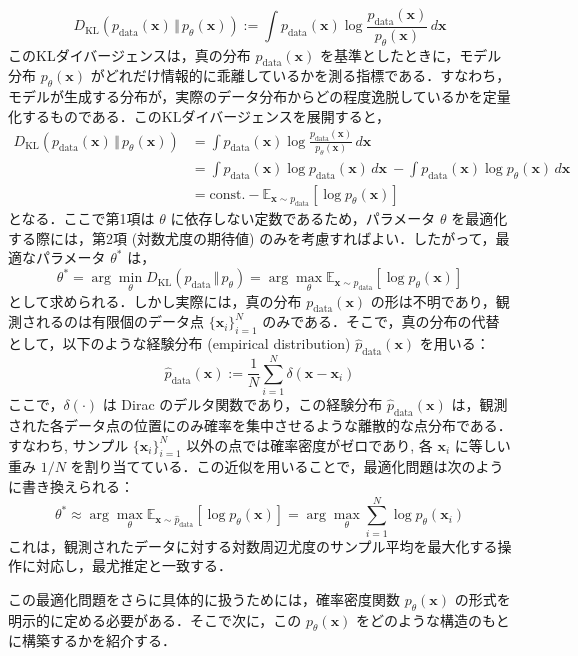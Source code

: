\documentclass[titlepage]{ltjsbook}
\begin{document}
\begin{equation}
D_{\mathrm{KL}}\left(p_{\mathrm{data}}(\mathbf{x}) \,\Vert\, p_\theta(\mathbf{x})\right)
:= \int p_{\mathrm{data}}(\mathbf{x}) \log \frac{p_{\mathrm{data}}(\mathbf{x})}{p_\theta(\mathbf{x})} \, d\mathbf{x}
\end{equation}
このKLダイバージェンスは，真の分布 $p_{\mathrm{data}}(\mathbf{x})$ を基準としたときに，モデル分布 $p_\theta(\mathbf{x})$ がどれだけ情報的に乖離しているかを測る指標である．すなわち，モデルが生成する分布が，実際のデータ分布からどの程度逸脱しているかを定量化するものである．このKLダイバージェンスを展開すると，
\begin{align}
D_{\mathrm{KL}}\left(p_{\mathrm{data}}(\mathbf{x}) \,\Vert\, p_\theta(\mathbf{x})\right)
&= \int p_{\mathrm{data}}(\mathbf{x}) \log \frac{p_{\mathrm{data}}(\mathbf{x})}{p_\theta(\mathbf{x})} \, d\mathbf{x} \\
&= \int p_{\mathrm{data}}(\mathbf{x}) \log p_{\mathrm{data}}(\mathbf{x}) \, d\mathbf{x} 
\ - \int p_{\mathrm{data}}(\mathbf{x}) \log p_\theta(\mathbf{x}) \, d\mathbf{x} \\
&= \text{const.} - \mathbb{E}_{\mathbf{x} \sim p_{\mathrm{data}}} \left[ \log p_\theta(\mathbf{x}) \right]
\end{align}
となる．ここで第1項は $\theta$ に依存しない定数であるため，パラメータ $\theta$ を最適化する際には，第2項 (対数尤度の期待値) のみを考慮すればよい．したがって，最適なパラメータ $\theta^*$ は，
\begin{equation}
\theta^* = \arg\min_\theta D_{\mathrm{KL}}\left(p_{\mathrm{data}} \,\Vert\, p_\theta\right)
= \arg\max_\theta \mathbb{E}_{\mathbf{x} \sim p_{\mathrm{data}}} \left[ \log p_\theta(\mathbf{x}) \right]
\end{equation}
として求められる．しかし実際には，真の分布 $p_{\mathrm{data}}(\mathbf{x})$ の形は不明であり，観測されるのは有限個のデータ点 $\{\mathbf{x}_i\}_{i=1}^N$ のみである．そこで，真の分布の代替として，以下のような経験分布 (empirical distribution) $\hat{p}_{\mathrm{data}}(\mathbf{x})$ を用いる：
\begin{equation}
\hat{p}_{\mathrm{data}}(\mathbf{x}) := \frac{1}{N} \sum_{i=1}^N \delta(\mathbf{x} - \mathbf{x}_i)
\end{equation}
ここで，$\delta(\cdot)$ は Dirac のデルタ関数であり，この経験分布 $\hat{p}_{\mathrm{data}}(\mathbf{x})$ は，観測された各データ点の位置にのみ確率を集中させるような離散的な点分布である．すなわち, サンプル $\{\mathbf{x}_i\}_{i=1}^N$ 以外の点では確率密度がゼロであり, 各 $\mathbf{x}_i$ に等しい重み $1/N$ を割り当てている．この近似を用いることで，最適化問題は次のように書き換えられる：
\begin{equation}
\theta^* \approx \arg\max_\theta \mathbb{E}_{\mathbf{x} \sim \hat{p}_{\mathrm{data}}} \left[ \log p_\theta(\mathbf{x}) \right]
= \arg\max_\theta \sum_{i=1}^N \log p_\theta(\mathbf{x}_i)
\end{equation}
これは，観測されたデータに対する対数周辺尤度のサンプル平均を最大化する操作に対応し，最尤推定と一致する．

この最適化問題をさらに具体的に扱うためには，確率密度関数 $p_\theta(\mathbf{x})$ の形式を明示的に定める必要がある．そこで次に，この $p_\theta(\mathbf{x})$ をどのような構造のもとに構築するかを紹介する．

\printbibliography[segment=\therefsegment,heading=subbibliography,title={参考文献}]
\end{document}
